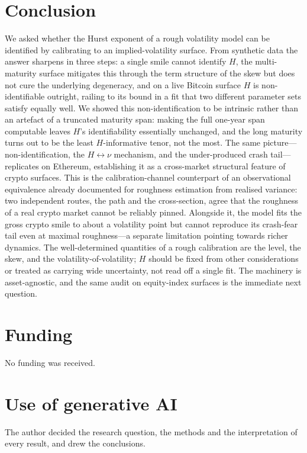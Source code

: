 \documentclass[11pt,a4paper]{article}
\numberwithin{equation}{section}
\begin{document}
\section{Conclusion}\label{sec:conclusion}

We asked whether the Hurst exponent of a rough volatility model can be identified by calibrating to an
implied-volatility surface. From synthetic data the answer sharpens in three steps: a single smile
cannot identify $H$, the multi-maturity surface mitigates this through the term structure of the skew
but does not cure the underlying degeneracy, and on a live Bitcoin surface $H$ is non-identifiable
outright, railing to its bound in a fit that two different parameter sets satisfy
equally well. We showed this non-identification to be intrinsic rather than an artefact of a truncated
maturity span: making the full one-year span computable leaves $H$'s identifiability essentially
unchanged, and the long maturity turns out to be the least $H$-informative tenor, not the most. The
same picture---non-identification, the $H\leftrightarrow\nu$ mechanism, and the under-produced crash
tail---replicates on Ethereum, establishing it as a cross-market structural feature of crypto surfaces.
This is the calibration-channel counterpart of an observational equivalence already documented for
roughness estimation from realised variance: two independent routes, the path and the cross-section,
agree that the roughness of a real crypto market cannot be reliably pinned. Alongside it, the model
fits the gross crypto smile to about a volatility point but cannot reproduce its crash-fear tail even
at maximal roughness---a separate limitation pointing towards richer dynamics. The well-determined
quantities of a rough calibration are the level, the skew, and the volatility-of-volatility; $H$
should be fixed from other considerations or treated as carrying wide uncertainty, not read off a
single fit. The machinery is asset-agnostic, and the same audit on equity-index surfaces is the
immediate next question.

\section*{Funding}
No funding was received.

\section*{Use of generative AI}
The author decided the research question, the methods and the interpretation of every
result, and drew the conclusions.
\end{document}
